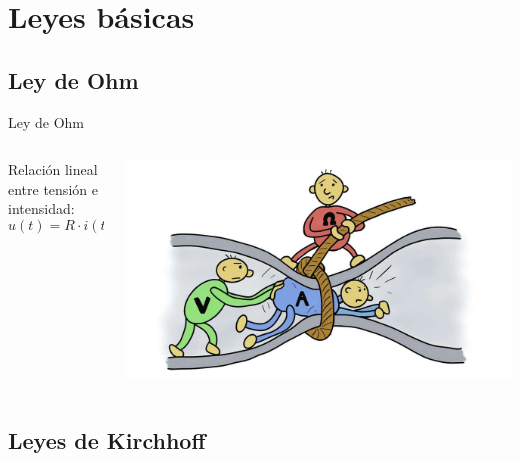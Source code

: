 \documentclass[aspectratio=169, xcolor={usenames,svgnames,dvipsnames}]{beamer}
\begin{document}
\section{Leyes básicas}

\subsection{Ley de Ohm}

\begin{frame}{Ley de Ohm}
\begin{columns}
\begin{column}{0.4\linewidth}
Relación \alert{lineal} entre tensión e intensidad: \[
\boxed{u(t) = R \cdot i(t)}
\]
\end{column}
\begin{column}{0.6\linewidth}
\begin{center}
    \includegraphics[width=\linewidth]{../figs/ohm.jpg}
\end{center}
\end{column}
\end{columns}
    
\end{frame}

\subsection{Leyes de Kirchhoff}
\end{document}

